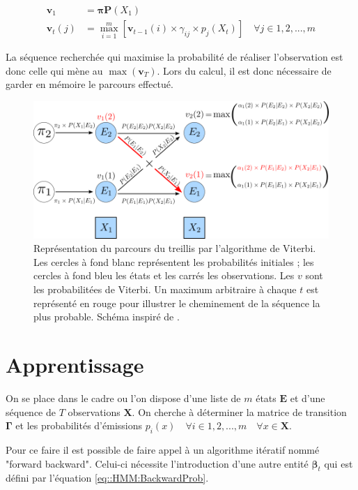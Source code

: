 \documentclass[12pt, french]{report}
\begin{document}
\begin{align} 
\label{eq::HMM:ViterbiAlgo}
\bm{v}_1 &= \bm{\pi} \bm{P}(X_1) \\ 
\bm{v}_t(j) &= \max\limits_{i=1}^m \left[ \bm{v}_{t-1}(i) \times \gamma_{ij} \times  p_j(X_t) \right] \quad \forall j \in 1,2,...,m
\end{align}

La séquence recherchée qui maximise la probabilité de réaliser l'observation est donc celle qui mène au $\max\left(\bm{v}_T\right)$. Lors du calcul, il est donc nécessaire de garder en mémoire le parcours effectué.

\begin{figure}[ht]
\begin{center}
\includegraphics[width= 0.8 \textwidth]{Images/Models/HMM/Viterbi.png}
\caption{Représentation du parcours du treillis par l'algorithme de Viterbi. Les cercles à fond blanc représentent les probabilités initiales ; les cercles à fond bleu les états et les carrés les observations. Les $v$ sont les probabilitées de Viterbi. Un maximum arbitraire à chaque $t$ est représenté en rouge pour illustrer le cheminement de la séquence la plus probable. Schéma inspiré de \cite{jurafsky_speech_2017}.}
\label{fig::HMM:ViterbiAlgo}
\end{center}
\end{figure}

\section{Apprentissage}
\label{subsubsec:Models_HMM_Apprentissage}
On se place dans le cadre ou l'on dispose d'une liste de $m$ états $\bm{E}$ et d'une séquence de $T$ observations $\bm{X}$. On cherche à déterminer la matrice de transition $\bm{\Gamma}$ et les probabilités d'émissions $p_i(x) \quad \forall i\in 1,2,...,m \quad \forall x \in \bm{X}$.

Pour ce faire il est possible de faire appel à un algorithme itératif nommé "forward backward". Celui-ci nécessite l'introduction d'une autre entité $\bm{\beta}_t$ qui est défini par l'équation \eqref{eq::HMM:BackwardProb}.
\end{document}
